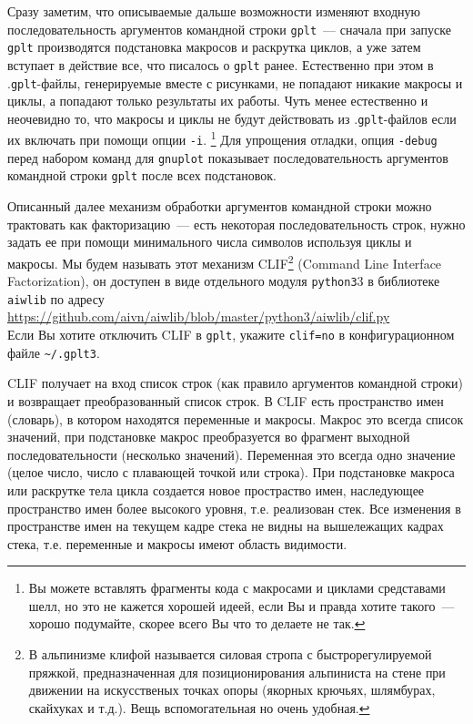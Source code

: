 \documentclass[12pt]{article}
\def\gplt{{\tt gplt}}
\def\gnuplot{{\tt gnuplot}}
\def\python{{\tt python3}}
\begin{document}
Сразу заметим, что описываемые дальше возможности
изменяют входную последовательность аргументов командной строки \gplt~--- сначала при запуске \gplt{} производятся подстановка макросов и
раскрутка циклов, а уже затем вступает в действие все, что писалось о \gplt{} ранее. Естественно при этом
в .\gplt-файлы, генерируемые вместе с рисунками, не попадают никакие макросы и циклы, а попадают только результаты их работы.
Чуть менее естественно и неочевидно то, что
макросы и циклы не будут действовать из .\gplt-файлов если их включать при помощи опции \verb'-i'.
\footnote{Вы можете вставлять фрагменты кода с макросами и циклами средставами шелл, но это не кажется хорошей идеей, если Вы и правда хотите такого~---
хорошо подумайте, скорее всего Вы что то делаете не так.}
Для упрощения отладки, опция \verb'-debug' перед набором команд для \gnuplot{} показывает
последовательность аргументов командной строки \gplt{} после всех подстановок.

Описанный далее механизм обработки аргументов командной строки можно трактовать как факторизацию~--- есть некоторая последовательность строк,
нужно задать ее при помощи минимального числа символов используя циклы и макросы. Мы будем называть этот механизм
CLIF\footnote{В альпинизме клифой называется силовая стропа с быстрорегулируемой пряжкой, предназначенная для позиционирования
  альпиниста на стене при движении на искусственых точках опоры (якорных крючьях, шлямбурах, скайхуках и т.д.). Вещь вспомогательная
  но очень удобная.}
(Command Line Interface Factorization), он доступен в виде отдельного модуля \python3{} в библиотеке \verb'aiwlib' по адресу\\
\url{https://github.com/aivn/aiwlib/blob/master/python3/aiwlib/clif.py}\\
Если Вы хотите отключить CLIF в \gplt, укажите \verb'clif=no' в конфигурационном файле \verb'~/.gplt3'.

CLIF получает на вход список строк (как правило аргументов командной строки) и возвращает преобразованный список строк.
В CLIF есть пространство имен (словарь), в котором находятся переменные и макросы. Макрос это всегда список значений, при подстановке макрос
преобразуется во фрагмент выходной последовательности (несколько значений). Переменная это всегда одно значение (целое число, число с плавающей точкой или строка).
При подстановке макроса или раскрутке тела цикла создается новое простраство имен, наследующее пространство имен более высокого уровня, т.е. реализован стек.
Все изменения в пространстве имен на текущем кадре стека не видны на вышележащих кадрах стека, т.е. переменные и макросы имеют область видимости.
\end{document}
